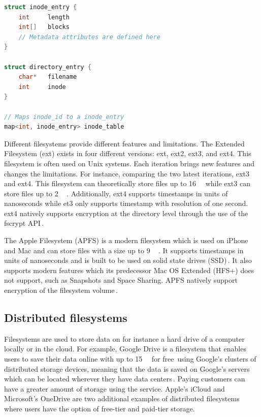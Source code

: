 \begin{minipage}{\linewidth}
\begin{lstlisting}[language=c, caption={Pseudocode of a minimalistic inode filesystem structure}, label=lst:inode_fs]
struct inode_entry {
	int 	length
	int[]	blocks
	// Metadata attributes are defined here
}

struct directory_entry {
	char*   filename
	int     inode
}

// Maps inode_id to a inode_entry
map<int, inode_entry> inode_table

\end{lstlisting}
\end{minipage}

Different filesystems provide different features and limitations. The Extended Filesystem (ext) exists in four different versions: ext, ext2, ext3, and ext4. This filesystem is often used on Unix systems. Each iteration brings new features and changes the limitations. For instance, comparing the two latest iterations, ext3 and ext4. This filesystem can theoretically store files up to \SI{16}{\tebi\byte} while ext3 can store files up to \SI{2}{\tebi\byte}\,\cite{salterUnderstandingLinuxFilesystems2018}. Additionally, ext4 supports timestamps in units of nanoseconds while et3 only supports timestamp with resolution of one second. ext4 natively supports encryption at the directory level through the use of the fscrypt API\,\cite{FscryptArchWiki}.

The Apple Filesystem (APFS) is a modern filesystem which is used on iPhone and Mac and can store files with a size up to \SI{9}{\exa\byte}\,\cite{APFSAppleFile2017}. It supports timestamps in units of nanoseconds and is built to be used on solid state drives (SSD)\,\cite{nelsonWhatAPFSDoes}. It also supports modern features which its predecessor Mac OS Extended (HFS+) does not support, such as Snapshots and Space Sharing. APFS natively support encryption of the filesystem volume\,\cite{appleinc.FileSystemFormats}.

\subsection{Distributed filesystems}
Filesystems are used to store data on for instance a hard drive of a computer locally or in the cloud. For example, Google Drive is a filesystem that enables users to save their data online with up to \SI{15}{\giga\byte} for free\,\cite{CloudStorageWork} using Google's clusters of distributed storage devices, meaning that the data is saved on Google's servers which can be located wherever they have data centers\,\cite{DistributedStorageWhat}. Paying customers can have a greater amount of storage using the service. Apple's iCloud and Microsoft's OneDrive are two additional examples of distributed filesystems where users have the option of free-tier and paid-tier storage.

